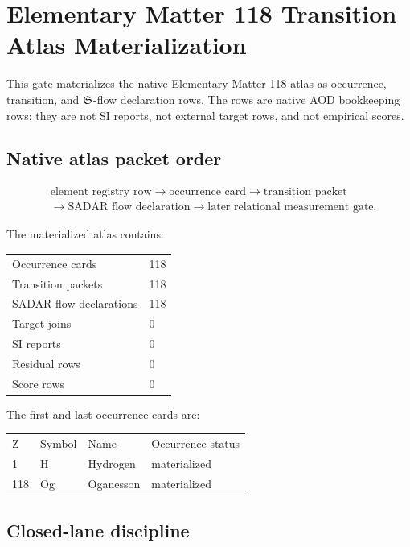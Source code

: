 
\section{Elementary Matter 118 Transition Atlas Materialization}

This gate materializes the native Elementary Matter 118 atlas as occurrence, transition, and \(\mathfrak S\)-flow declaration rows.  The rows are native AOD bookkeeping rows; they are not SI reports, not external target rows, and not empirical scores.

\subsection*{Native atlas packet order}

\[
\begin{aligned}
&\text{element registry row}
\rightarrow
\text{occurrence card}
\rightarrow
\text{transition packet}\\
&\rightarrow
\text{SADAR flow declaration}
\rightarrow
\text{later relational measurement gate.}
\end{aligned}
\]

The materialized atlas contains:

\begin{center}
\begin{tabular}{ll}
Occurrence cards & 118\\
Transition packets & 118\\
SADAR flow declarations & 118\\
Target joins & 0\\
SI reports & 0\\
Residual rows & 0\\
Score rows & 0\\
\end{tabular}
\end{center}

The first and last occurrence cards are:

\begin{center}
\begin{tabular}{llll}
Z & Symbol & Name & Occurrence status\\
1 & H & Hydrogen & materialized\\
118 & Og & Oganesson & materialized\\
\end{tabular}
\end{center}

\subsection*{Closed-lane discipline}

